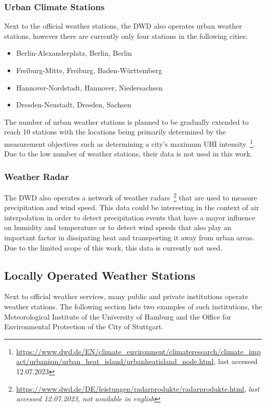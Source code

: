 \subsubsection{Urban Climate Stations}

Next to the official weather stations, the DWD also operates urban weather stations, however there are currently only four stations in the following cities:

\begin{itemize}
    \item Berlin-Alexanderplatz, Berlin, Berlin
    \item Freiburg-Mitte, Freiburg, Baden-Württemberg
    \item Hannover-Nordstadt, Hannover, Niedersachsen
    \item Dresden-Neustadt, Dresden, Sachsen
\end{itemize}

The number of urban weather stations is planned to be gradually extended to reach 10 stations with the locations being primarily determined by the measurement objectives such as determining a city's maximum UHI intensity~\footnote{\url{https://www.dwd.de/EN/climate\_environment/climateresearch/climate\_impact/urbanism/urban\_heat\_island/urbanheatisland\_node.html}, last accessed 12.07.2023}. Due to the low number of weather stations, their data is not used in this work.

\subsubsection{Weather Radar}

The DWD also operates a network of weather radars~\footnote{\url{https://www.dwd.de/DE/leistungen/radarprodukte/radarprodukte.html}, \textit{last accessed 12.07.2023, not available in english}} that are used to measure precipitation and wind speed. This data could be interesting in the context of air interpolation in order to detect precipitation events that have a mayor influence on humidity and temperature or to detect wind speeds that also play an important factor in dissipating heat and transporting it away from urban areas. Due to the limited scope of this work, this data is currently not used.

\subsection{Locally Operated Weather Stations}

Next to official weather services, many public and private institutions operate weather stations. The following section lists two examples of such institutions, the Meteorological Institute of the University of Hamburg and the Office for Environmental Protection of the City of Stuttgart.

